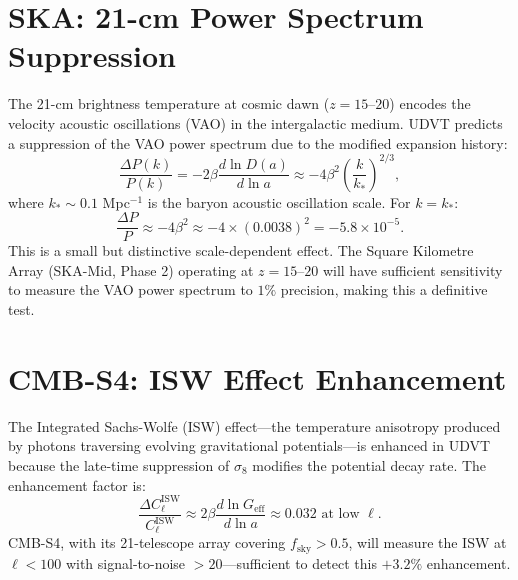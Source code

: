 \documentclass[12pt,a4paper]{book}
\theoremstyle{definition}
\theoremstyle{remark}
\begin{document}
\section{SKA: 21-cm Power Spectrum Suppression}

The 21-cm brightness temperature at cosmic dawn ($z = 15$--$20$) encodes the velocity acoustic oscillations (VAO) in the intergalactic medium. UDVT predicts a suppression of the VAO power spectrum due to the modified expansion history:
\begin{equation}
    \frac{\Delta P(k)}{P(k)} = -2\beta \frac{d\ln D(a)}{d\ln a} \approx -4\beta^2 \left(\frac{k}{k_*}\right)^{2/3},
\end{equation}
where $k_* \sim 0.1$ Mpc$^{-1}$ is the baryon acoustic oscillation scale. For $k = k_*$:
\begin{equation}
    \frac{\Delta P}{P} \approx -4\beta^2 \approx -4 \times (0.0038)^2 = -5.8 \times 10^{-5}.
\end{equation}
This is a small but distinctive scale-dependent effect. The Square Kilometre Array (SKA-Mid, Phase 2) operating at $z = 15$--$20$ will have sufficient sensitivity to measure the VAO power spectrum to $1\%$ precision, making this a definitive test.

\section{CMB-S4: ISW Effect Enhancement}

The Integrated Sachs-Wolfe (ISW) effect---the temperature anisotropy produced by photons traversing evolving gravitational potentials---is enhanced in UDVT because the late-time suppression of $\sigma_8$ modifies the potential decay rate. The enhancement factor is:
\begin{equation}
    \frac{\Delta C_\ell^{\mathrm{ISW}}}{C_\ell^{\mathrm{ISW}}} \approx 2\beta \frac{d\ln G_{\mathrm{eff}}}{d\ln a} \approx 0.032 \text{ at low } \ell.
\end{equation}
CMB-S4, with its 21-telescope array covering $f_{\mathrm{sky}} > 0.5$, will measure the ISW at $\ell < 100$ with signal-to-noise $> 20$---sufficient to detect this $+3.2\%$ enhancement.
\end{document}
